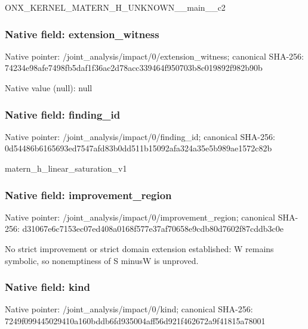 \documentclass[10pt,a4paper]{article}
\begin{document}
\begingroup\raggedright\sloppy ONX\_\allowbreak{}KERNEL\_\allowbreak{}MATERN\_\allowbreak{}H\_\allowbreak{}UNKNOWN\_\allowbreak{}\_\allowbreak{}main\_\allowbreak{}\_\allowbreak{}c2\par\endgroup

\subsubsection{Native field: extension\_\allowbreak{}witness}
Native pointer: /joint\_\allowbreak{}analysis/impact/0/extension\_\allowbreak{}witness; canonical SHA-256: 74234e98afe7498fb5daf1f36ac2d78acc339464f950703b8c019892f982b90b

Native value (null): null

\subsubsection{Native field: finding\_\allowbreak{}id}
Native pointer: /joint\_\allowbreak{}analysis/impact/0/finding\_\allowbreak{}id; canonical SHA-256: 0d54486b6165693ed7547afd83b0dd511b15092afa324a35e5b989ae1572c82b

\begingroup\raggedright\sloppy matern\_\allowbreak{}h\_\allowbreak{}linear\_\allowbreak{}saturation\_\allowbreak{}v1\par\endgroup

\subsubsection{Native field: improvement\_\allowbreak{}region}
Native pointer: /joint\_\allowbreak{}analysis/impact/0/improvement\_\allowbreak{}region; canonical SHA-256: d31067e6c7153ec07ed408a0168f577e37af70658e9cdb80d7602f87cddb3c0e

\begingroup\raggedright\sloppy No strict improvement or strict domain extension established:\allowbreak{} W remains symbolic,\allowbreak{} so nonemptiness of S minusW is unproved.\par\endgroup

\subsubsection{Native field: kind}
Native pointer: /joint\_\allowbreak{}analysis/impact/0/kind; canonical SHA-256: 7249f099445029410a160bddb6fd935004aff56d921f462672a9f41815a78001
\end{document}
